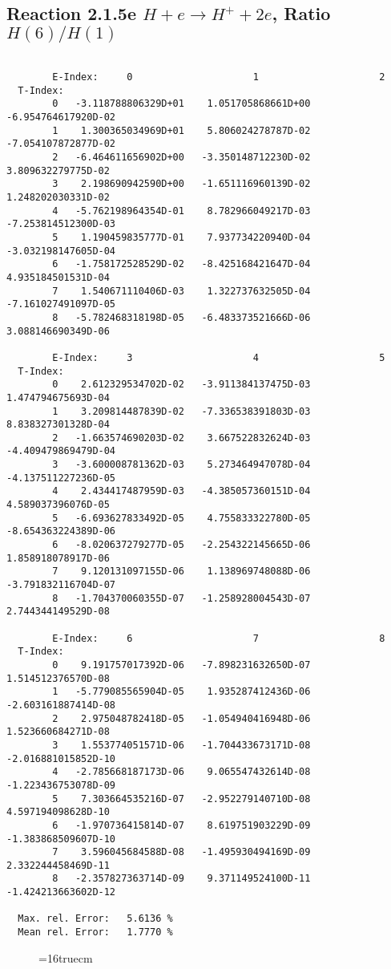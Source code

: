 \documentclass[12pt,dvipdfmx]{article}
\begin{document}
\newpage
\subsection{
Reaction 2.1.5e  $H + e \rightarrow H^+ + 2e$, Ratio $H(6)/H(1)$
}


\begin{small}\begin{verbatim}

        E-Index:     0                     1                     2
  T-Index:
        0   -3.118788806329D+01    1.051705868661D+00   -6.954764617920D-02
        1    1.300365034969D+01    5.806024278787D-02   -7.054107872877D-02
        2   -6.464611656902D+00   -3.350148712230D-02    3.809632279775D-02
        3    2.198690942590D+00   -1.651116960139D-02    1.248202030331D-02
        4   -5.762198964354D-01    8.782966049217D-03   -7.253814512300D-03
        5    1.190459835777D-01    7.937734220940D-04   -3.032198147605D-04
        6   -1.758172528529D-02   -8.425168421647D-04    4.935184501531D-04
        7    1.540671110406D-03    1.322737632505D-04   -7.161027491097D-05
        8   -5.782468318198D-05   -6.483373521666D-06    3.088146690349D-06

        E-Index:     3                     4                     5
  T-Index:
        0    2.612329534702D-02   -3.911384137475D-03    1.474794675693D-04
        1    3.209814487839D-02   -7.336538391803D-03    8.838327301328D-04
        2   -1.663574690203D-02    3.667522832624D-03   -4.409479869479D-04
        3   -3.600008781362D-03    5.273464947078D-04   -4.137511227236D-05
        4    2.434417487959D-03   -4.385057360151D-04    4.589037396076D-05
        5   -6.693627833492D-05    4.755833322780D-05   -8.654363224389D-06
        6   -8.020637279277D-05   -2.254322145665D-06    1.858918078917D-06
        7    9.120131097155D-06    1.138969748088D-06   -3.791832116704D-07
        8   -1.704370060355D-07   -1.258928004543D-07    2.744344149529D-08

        E-Index:     6                     7                     8
  T-Index:
        0    9.191757017392D-06   -7.898231632650D-07    1.514512376570D-08
        1   -5.779085565904D-05    1.935287412436D-06   -2.603161887414D-08
        2    2.975048782418D-05   -1.054940416948D-06    1.523660684271D-08
        3    1.553774051571D-06   -1.704433673171D-08   -2.016881015852D-10
        4   -2.785668187173D-06    9.065547432614D-08   -1.223436753078D-09
        5    7.303664535216D-07   -2.952279140710D-08    4.597194098628D-10
        6   -1.970736415814D-07    8.619751903229D-09   -1.383868509607D-10
        7    3.596045684588D-08   -1.495930494169D-09    2.332244458469D-11
        8   -2.357827363714D-09    9.371149524100D-11   -1.424213663602D-12

  Max. rel. Error:   5.6136 %
  Mean rel. Error:   1.7770 %

\end{verbatim}\end{small}
\begin{figure} \label{2.1.5e}
\epsfxsize=16truecm
\end{figure}
\end{document}
